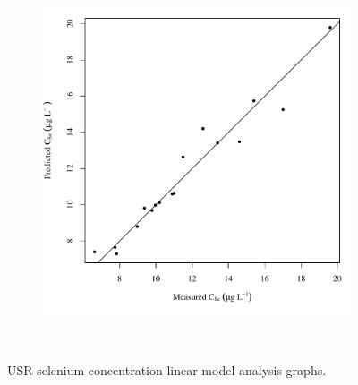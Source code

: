 \begin{linenumbers}
\begin{landscape}
\begin{figure}
\begin{subfigure}{0.7\textwidth}
			\includegraphics[width=\tableCustomSize]{"Figures/Results_USR/Stochastic/Conc Model pred v meas CAN"}
		\end{subfigure}\\
		\caption{USR selenium concentration linear model analysis graphs.}
	\end{figure}
\end{landscape}


\end{linenumbers}
